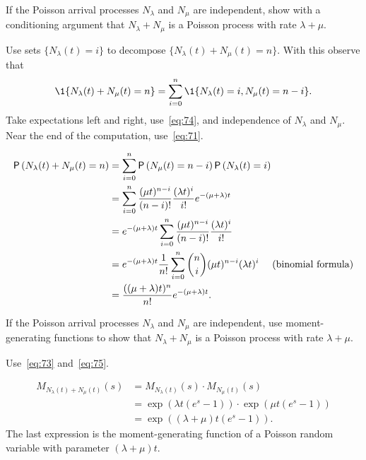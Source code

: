 \begin{exercise} 
If the Poisson arrival processes $N_\lambda$ and $N_\mu$ are independent, show with a conditioning argument that
$N_\lambda + N_\mu$ is a Poisson process with rate $\lambda + \mu$. 
\begin{hint}
 Use sets $\{N_\lambda(t) = i\}$ to decompose $\{N_\lambda(t) + N_\mu(t) = n\}$. With this observe that
 \begin{equation*}
 \1{N_\lambda(t) + N_\mu(t) = n} = 
 \sum_{i=0}^n \1{N_\lambda(t)=i, N_\mu(t) = n-i}.
 \end{equation*}
Take expectations left and right, use~\cref{eq:74}, and independence of $N_\lambda$ and $N_\mu$. Near the end of the computation, use~\cref{eq:71}.
\end{hint}
\begin{solution}
\begin{align*}\label{eq:002}
\P{N_\lambda(t) + N_\mu(t) = n} 
&= \sum_{i=0}^n \P{ N_\mu(t) = n-i}\P{N_\lambda(t)=i} \\
&= \sum_{i=0}^n \frac{(\mu t)^{n-i}}{(n-i)!} \frac{(\lambda t)^i}{i!} e^{-(\mu+\lambda)t} \\
&= e^{-(\mu+\lambda)t} \sum_{i=0}^n \frac{(\mu t)^{n-i}}{(n-i)!} \frac{(\lambda t)^i}{i!} \\
&= e^{-(\mu+\lambda)t}\frac 1{n!} \sum_{i=0}^n {n \choose i }(\mu t)^{n-i}(\lambda t)^i \quad\text{ (binomial formula)} \\
&= \frac{((\mu+\lambda)t)^n}{n!}e^{-(\mu+\lambda)t}.
 \end{align*}
\end{solution}
\end{exercise}

\begin{extra}
 If the Poisson arrival processes $N_\lambda$ and $N_\mu$ are independent, use moment-generating functions to show that $N_\lambda + N_\mu$ is a Poisson process with rate $\lambda + \mu$.
\begin{hint}
 Use~\cref{eq:73} and~\cref{eq:75}.
\end{hint}

\begin{solution}
\begin{align*}
M_{N_\lambda(t)+N_\mu(t)}(s) 
&= M_{N_\lambda(t)}(s)\cdot M_{N_{\mu}(t)}(s) \\
&=\exp(\lambda t (e^s -1))\cdot \exp(\mu t(e^s-1)) \\
&= \exp((\lambda + \mu)t (e^s-1)).
\end{align*}
The last expression is the moment-generating function of a Poisson random variable with parameter $(\lambda+\mu)t$.
\end{solution}
\end{extra}



